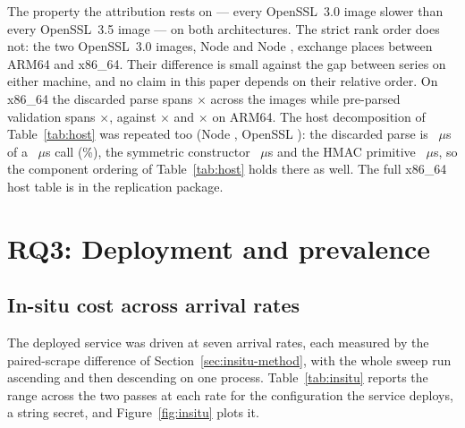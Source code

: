 \documentclass[pdflatex,sn-basic,twocolumn]{sn-jnl}%
\begin{document}
The property the attribution rests on --- every OpenSSL~3.0 image slower than
every OpenSSL~3.5 image --- \XmSeriesSplitHolds{} on both architectures. The
strict rank order does not: the two OpenSSL~3.0 images, Node
\NodeEighteenNodeMajor{} and Node \NodeTwentyNodeMajor, exchange places between
ARM64 and x86\_64. Their difference is small against the gap between series on
either machine, and no claim in this paper depends on their relative order. On x86\_64 the discarded parse spans
\XmSpanProbeThrows$\times$ across the images while pre-parsed validation spans
\XmSpanJwtPreparsed$\times$, against \SpanProbeThrows$\times$ and
\SpanJwtPreparsed$\times$ on ARM64. The host decomposition of
Table~\ref{tab:host} was repeated too (Node \XhNode, OpenSSL \XhOpenssl): the
discarded parse is \XhProbeThrows~$\mu$s of a \XhJwtString~$\mu$s call
(\XhProbeShareOfCall\%), the symmetric constructor \XhCreateSecretKey~$\mu$s
and the HMAC primitive \XhHmacString~$\mu$s, so the component ordering of
Table~\ref{tab:host} holds there as well. The full x86\_64 host table is in the
replication package.

\section{RQ3: Deployment and prevalence}\label{sec:rq3}

\subsection{In-situ cost across arrival rates}\label{sec:insitu}

The deployed service was driven at seven arrival rates, each measured by the
paired-scrape difference of Section~\ref{sec:insitu-method}, with the whole sweep
run ascending and then descending on one process. Table~\ref{tab:insitu} reports
the range across the two passes at each rate for the configuration the service
deploys, a string secret, and Figure~\ref{fig:insitu} plots it.
\end{document}
